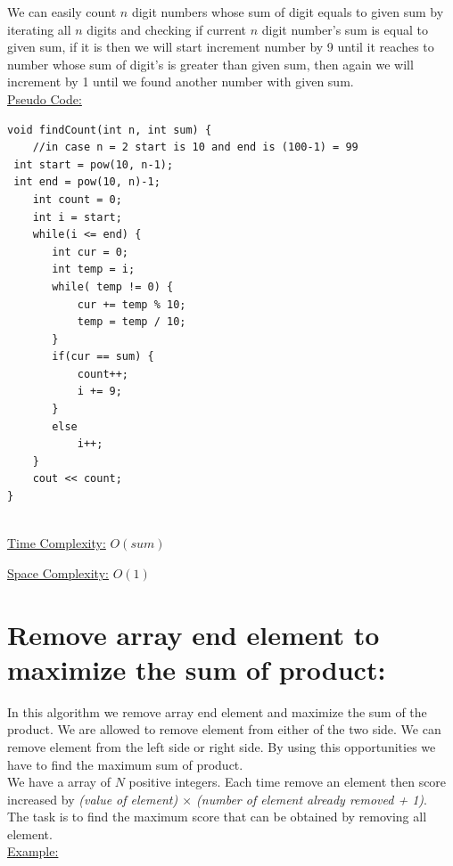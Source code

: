 \documentclass[12pt]{book}
\begin{document}
We can easily count $n$ digit numbers whose sum of digit equals to given sum by iterating all $n$ digits and checking if current $n$ digit number’s sum is equal to given sum, if it is then we will start increment number by 9 until it reaches to number whose sum of digit’s is greater than given sum, then again we will increment by 1 until we found another number with given sum.\\

\underline{Pseudo Code:}\\
\begin{lstlisting}
void findCount(int n, int sum) { 
    //in case n = 2 start is 10 and end is (100-1) = 99 
 int start = pow(10, n-1); 
 int end = pow(10, n)-1; 
    int count = 0; 
    int i = start; 
    while(i <= end) { 
       int cur = 0; 
       int temp = i; 
       while( temp != 0) { 
           cur += temp % 10; 
           temp = temp / 10; 
       } 
       if(cur == sum) {          	
           count++;          	
           i += 9;      	
       }
       else
           i++; 
    }  	
    cout << count;
} 
\end{lstlisting}

\underline{\\Time Complexity:}  $O(sum)$\newline

\underline{Space Complexity:}  $O(1)$\newline

\chapter{Remove array end element to maximize the sum of product:}
In this algorithm we remove array end element and maximize the sum of the product. We are allowed to remove element from either of the two side. We can remove element from the left side or right side. By using this opportunities we have to find the maximum sum of product.\\
We have a array of $N$ positive integers. Each time remove an element then score increased by\newline
\textit{(value of element) $\times$ (number of element already removed + 1)}.\newline\\
The task is to find the maximum score that can be obtained by removing all element.\\

\underline{Example:}\\
\end{document}
